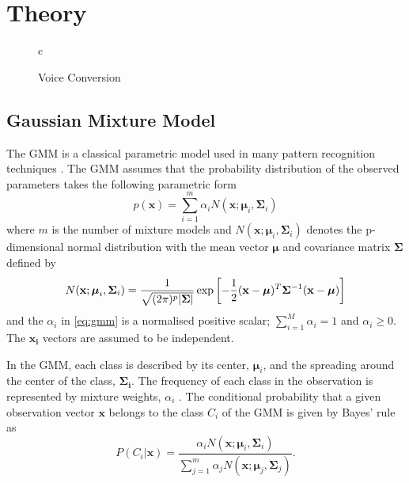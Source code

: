 \chapter{Theory} %
\label{cha:theory}

\begin{figure}[htbp]
  \centering
   \begin{tabular}[h]{c}
  \end{tabular}
  \caption{Voice Conversion}
  \label{fig:ADPCM}
\end{figure}

\section{Gaussian Mixture Model} %
\label{sec:gaussian_mixture_model}
The GMM is a classical parametric model used in many pattern recognition techniques \cite{stylianou98}. The GMM assumes that the probability distribution of the observed parameters takes the following parametric form
\begin{equation}
	\label{eq:gmm}
	p(\mathbf{x}) = \sum_{i=1}^{m} \alpha_i N(\mathbf{x}; \boldsymbol{\mu}_i, \mathbf{\Sigma}_i)
\end{equation}
where $m$ is the number of mixture models and $N(\mathbf{x}; \boldsymbol{\mu}_i, \mathbf{\Sigma}_i)$ denotes the p-dimensional normal distribution with the mean vector $\boldsymbol{\mu}$ and covariance matrix $\mathbf{\Sigma}$ defined by
\begin{equation}
	N(\mathbf{x}; \boldsymbol{\mu}_i, \mathbf{\Sigma}_i) = \frac{1}{\sqrt{(2\pi)^p\lvert\mathbf{\Sigma}\rvert}} \exp\left[ -\frac{1}{2} (\mathbf{x} -\boldsymbol{\mu})^T \mathbf{\Sigma}^{-1} (\mathbf{x} -\boldsymbol{\mu})\right]
\end{equation}
and the $\alpha_i$ in \eqref{eq:gmm} is a normalised positive scalar; $\sum_{i=1}^{M}\alpha_i = 1$ and $\alpha_i \geq 0$. The $\mathbf{x_i}$ vectors are assumed to be independent.

In the GMM, each class is described by its center, $\boldsymbol{\mu}_i$, and the spreading around the center of the class, $\mathbf{\Sigma_i}$. The frequency of each class in the observation is represented by mixture weights, $\alpha_i$ \cite{stylianou98}. The conditional probability that a given observation vector $\mathbf{x}$ belongs to the class $C_i$ of the GMM is given by Bayes' rule \cite{statistikk} as
\begin{equation}
	\label{eq:bayes}
	P(C_i\vert \mathbf{x}) = \frac{\alpha_i N(\mathbf{x}; \boldsymbol{\mu}_i, \mathbf{\Sigma}_i)}{\sum_{j=1}^{m}\alpha_j N(\mathbf{x}; \boldsymbol{\mu}_j, \mathbf{\Sigma}_j)}.
\end{equation}


